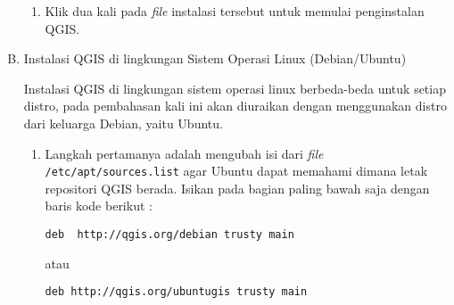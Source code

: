 \begin{enumerate}[A.]
\begin{enumerate}[1.]
\item Klik dua kali pada \textit{file} instalasi tersebut untuk memulai penginstalan QGIS.

\end{enumerate}

\item Instalasi QGIS di lingkungan Sistem Operasi Linux (Debian/Ubuntu)

Instalasi QGIS di lingkungan sistem operasi linux berbeda-beda untuk setiap distro, pada pembahasan kali ini akan diuraikan dengan menggunakan distro dari keluarga Debian, yaitu Ubuntu.

\begin{enumerate}[1.]

\item Langkah pertamanya adalah mengubah isi dari \textit{file} \verb|/etc/apt/sources.list| agar Ubuntu dapat memahami dimana letak repositori QGIS berada. Isikan pada bagian paling bawah saja dengan baris kode berikut :

\begin{verbatim}
deb  http://qgis.org/debian trusty main
\end{verbatim}

atau 

\begin{verbatim}
deb http://qgis.org/ubuntugis trusty main
\end{verbatim}



\end{enumerate}

\end{enumerate}

